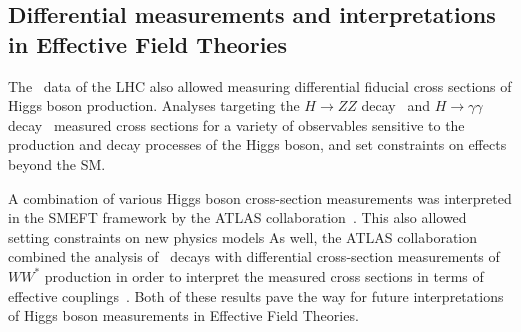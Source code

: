 \subsection{Differential measurements and interpretations in Effective Field Theories}
The \RunTwo\ data of the LHC also allowed measuring differential fiducial cross sections of Higgs boson production. Analyses targeting the $H \to ZZ$ decay~\cite{ATLAS:2020wny} and $H \to \gamma\gamma$ decay~\cite{hgammagammaDiff} measured cross sections for a variety of observables sensitive to the production and decay processes of the Higgs boson, and set constraints on effects beyond the SM.

A combination of various Higgs boson cross-section measurements was interpreted in the SMEFT framework by the ATLAS collaboration~\cite{ATLAS-CONF-2020-053}. This also allowed setting constraints on new physics models
As well, the ATLAS collaboration combined the analysis of \HWW\ decays with differential cross-section measurements of $WW^*$ production in order to interpret the measured cross sections in terms of effective couplings~\cite{ATL-PHYS-PUB-2021-010}.
Both of these results pave the way for future interpretations of Higgs boson measurements in Effective Field Theories. %




